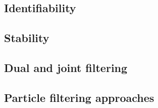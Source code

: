 \subsection{Identifiability}
\parencite{Haykin2001,Cappe2005}
\subsection{Stability}
\parencite{Haykin2001}
\subsection{Dual and joint filtering}
\parencite{Haykin2001}
\subsection{Particle filtering approaches}
\parencite{Kantas2009,doucet2001sequential,Lindsten2010}